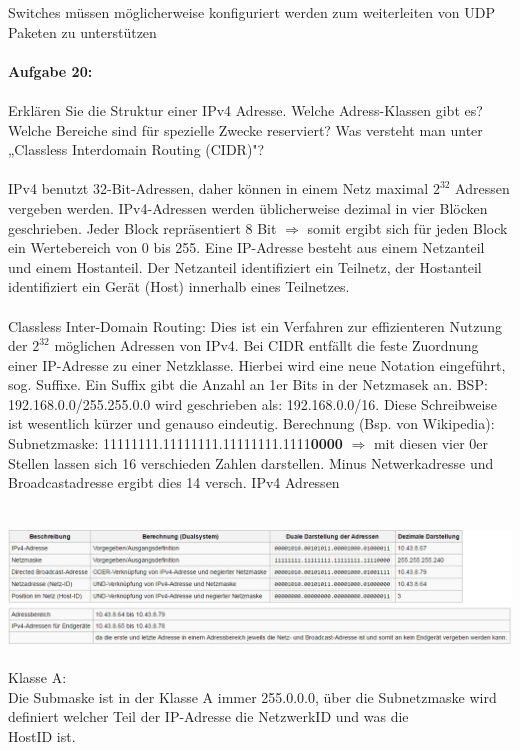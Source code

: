 \documentclass[12pt,a4paper]{report}
\begin{document}
Switches müssen möglicherweise konfiguriert werden zum weiterleiten von UDP Paketen zu unterstützen
\\
\\
\textbf{Aufgabe 20:}
\\
\\
Erklären Sie die Struktur einer IPv4 Adresse. Welche Adress-Klassen gibt es?
Welche Bereiche sind für spezielle Zwecke reserviert? Was versteht man unter
„Classless Interdomain Routing (CIDR)"?
\\
\\
IPv4 benutzt 32-Bit-Adressen, daher können in einem Netz maximal $2^{32}$ Adressen vergeben werden.
IPv4-Adressen werden üblicherweise dezimal in vier Blöcken geschrieben. Jeder Block repräsentiert 8 Bit $\Rightarrow$ somit ergibt sich für jeden Block ein Wertebereich von 0 bis 255. 
Eine IP-Adresse besteht aus einem Netzanteil und einem Hostanteil. Der Netzanteil identifiziert ein Teilnetz, der Hostanteil identifiziert ein Gerät (Host) innerhalb eines Teilnetzes.
\\
\\
Classless Inter-Domain Routing: Dies ist ein Verfahren zur effizienteren Nutzung der $2^{32}$ möglichen Adressen von IPv4. Bei CIDR entfällt die feste Zuordnung einer IP-Adresse zu einer Netzklasse. Hierbei wird eine neue Notation eingeführt, sog. Suffixe. Ein Suffix gibt die Anzahl an 1er Bits in der Netzmasek an. BSP: 192.168.0.0/255.255.0.0 wird geschrieben als: 192.168.0.0/16. Diese Schreibweise ist wesentlich kürzer und genauso eindeutig.
Berechnung (Bsp. von Wikipedia): 
Subnetzmaske: 11111111.11111111.11111111.1111\textbf{0000} $\Rightarrow$ mit diesen vier 0er Stellen lassen sich 16 verschieden Zahlen darstellen. Minus Netwerkadresse und Broadcastadresse ergibt dies 14 versch. IPv4 Adressen
\\
\\
\includegraphics[width = 17cm, height = 4cm]{bsp-cidr.jpg}
\newpage
Klasse A:\\
Die Submaske ist in der Klasse A immer 255.0.0.0, über die Subnetzmaske wird definiert welcher Teil der IP-Adresse die NetzwerkID und was die \\HostID ist.\\
\end{document}
